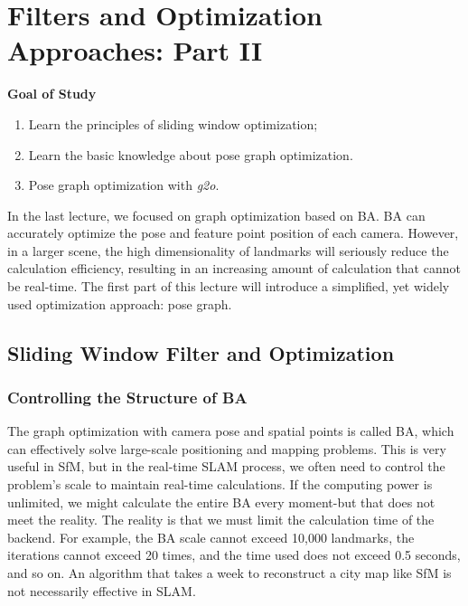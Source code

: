 \chapter{Filters and Optimization Approaches: Part II}
\label{cpt:backend2}
\begin{mdframed}  
	\textbf{Goal of Study}
	\begin{enumerate}[labelindent=0em,leftmargin=1.5em]
		\item Learn the principles of sliding window optimization; 
		\item Learn the basic knowledge about pose graph optimization.
		\item Pose graph optimization with \textit{g2o}.
	\end{enumerate}
\end{mdframed}

In the last lecture, we focused on graph optimization based on BA. BA can accurately optimize the pose and feature point position of each camera. However, in a larger scene, the high dimensionality of landmarks will seriously reduce the calculation efficiency, resulting in an increasing amount of calculation that cannot be real-time. The first part of this lecture will introduce a simplified, yet widely used optimization approach: pose graph.

\newpage
\section{Sliding Window Filter and Optimization}
\subsection{Controlling the Structure of BA}

The graph optimization with camera pose and spatial points is called BA, which can effectively solve large-scale positioning and mapping problems. This is very useful in SfM, but in the real-time SLAM process, we often need to control the problem's scale to maintain real-time calculations. If the computing power is unlimited, we might calculate the entire BA every moment-but that does not meet the reality. The reality is that we must limit the calculation time of the backend. For example, the BA scale cannot exceed 10,000 landmarks, the iterations cannot exceed 20 times, and the time used does not exceed 0.5 seconds, and so on. An algorithm that takes a week to reconstruct a city map like SfM is not necessarily effective in SLAM.

